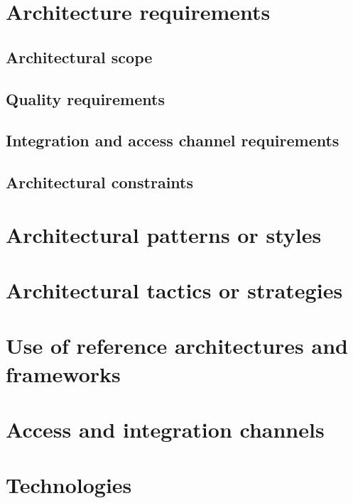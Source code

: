 \documentclass[pdftex,10pt,a4paper]{report}
\begin{document}


\newpage


\newpage
{}

\tableofcontents 

\newpage
{}

\begingroup
\renewcommand{\cleardoublepage}{}
\renewcommand{\clearpage}{}
\chapter{Architecture requirements}
	\section{Architectural scope}
		
	\section{Quality requirements}
		
	\section{Integration and access channel requirements}
		
	\section{Architectural constraints}
		
\endgroup

\newpage
	
\begingroup
\renewcommand{\cleardoublepage}{}
\renewcommand{\clearpage}{}	
\chapter{Architectural patterns or styles}
	
\endgroup

\newpage
	
\begingroup
\renewcommand{\cleardoublepage}{}
\renewcommand{\clearpage}{}
\chapter{Architectural tactics or strategies}
	
\endgroup

\newpage
	
\begingroup
\renewcommand{\cleardoublepage}{}
\renewcommand{\clearpage}{}	
\chapter{Use of reference architectures and frameworks}
	
\endgroup

\newpage

\begingroup
\renewcommand{\cleardoublepage}{}
\renewcommand{\clearpage}{}
\chapter{Access and integration channels}
	
\endgroup

\newpage
	
\begingroup
\renewcommand{\cleardoublepage}{}
\renewcommand{\clearpage}{}
\chapter{Technologies}
	
\endgroup
	
\end{document}
